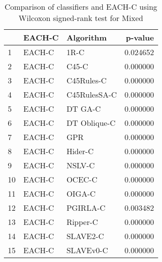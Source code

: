 \begin{table}
\footnotesize
\caption{Comparison of classifiers and EACH-C using Wilcoxon signed-rank test for Mixed}
\label{tab:EACH-C wilcoxon Mixed comparison}
\begin{tabular}{lllr}
\hline
 & EACH-C & Algorithm & p-value \\
\hline
1 & EACH-C & 1R-C & 0.024652 \\
2 & EACH-C & C45-C & 0.000000 \\
3 & EACH-C & C45Rules-C & 0.000000 \\
4 & EACH-C & C45RulesSA-C & 0.000000 \\
5 & EACH-C & DT GA-C & 0.000000 \\
6 & EACH-C & DT Oblique-C & 0.000000 \\
7 & EACH-C & GPR & 0.000000 \\
8 & EACH-C & Hider-C & 0.000000 \\
9 & EACH-C & NSLV-C & 0.000000 \\
10 & EACH-C & OCEC-C & 0.000000 \\
11 & EACH-C & OIGA-C & 0.000000 \\
12 & EACH-C & PGIRLA-C & 0.003482 \\
13 & EACH-C & Ripper-C & 0.000000 \\
14 & EACH-C & SLAVE2-C & 0.000000 \\
15 & EACH-C & SLAVEv0-C & 0.000000 \\
\hline
\end{tabular}
\end{table}
